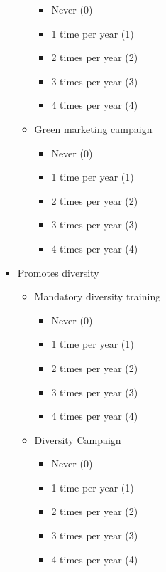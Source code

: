 \begin{itemize}
\begin{itemize}
            \begin{itemize}
                \item Never (0)
                \item 1 time per year (1)
                \item 2 times per year (2)
                \item 3 times per year (3)
                \item 4 times per year (4)
            \end{itemize}
        \item Green marketing campaign
            \begin{itemize}
                \item Never (0)
                \item 1 time per year (1)
                \item 2 times per year (2)
                \item 3 times per year (3)
                \item 4 times per year (4)
            \end{itemize}
    \end{itemize}
    \item Promotes diversity
    \begin{itemize}
       \item Mandatory diversity training
            \begin{itemize}
                \item Never (0)
                \item 1 time per year (1)
                \item 2 times per year (2)
                \item 3 times per year (3)
                \item 4 times per year (4)
            \end{itemize}
        \item Diversity Campaign
            \begin{itemize}
                \item Never (0)
                \item 1 time per year (1)
                \item 2 times per year (2)
                \item 3 times per year (3)
                \item 4 times per year (4)
            \end{itemize}
    \end{itemize}
\end{itemize}

